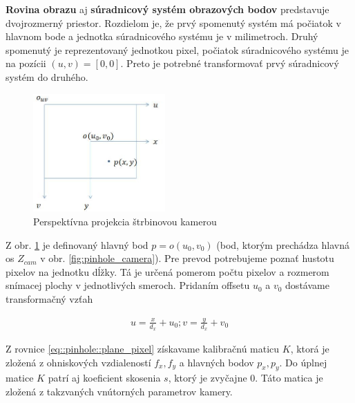 \textbf{Rovina obrazu} aj \textbf{súradnicový systém obrazových bodov} predstavuje dvojrozmerný priestor. Rozdielom je, že prvý spomenutý systém má počiatok v hlavnom bode a jednotka súradnicového systému je v milimetroch. Druhý spomenutý je reprezentovaný jednotkou pixel, počiatok súradnicového systému je na pozícii $\left(u,v\right)=\left[0,0\right]$. Preto je potrebné transformovať prvý súradnicový systém do druhého. 

\begin{figure}[h]
	\centering
	\includegraphics[width=0.45\textwidth]{figures/plane_pixel.jpg} 
	\caption{Perspektívna projekcia štrbinovou kamerou}
	\label{fig:plane_pixel}
\end{figure}

Z obr. \ref{fig:plane_pixel} je definovaný hlavný bod $p=o(u_0,v_0)$ (bod, ktorým prechádza hlavná os $Z_{cam}$ v obr. \ref{fig:pinhole_camera}). Pre prevod potrebujeme poznať hustotu pixelov na jednotku dĺžky. Tá je určená pomerom počtu pixelov a rozmerom snímacej plochy v jednotlivých smeroch. Pridaním offsetu $u_0$ a $v_0$ dostávame transformačný vzťah

\begin{equation}
\label{eq::pinhole::plane_pixel}
\begin{aligned}
u=\frac{x}{d_x} + u_0; v=\frac{y}{d_x} + v_0
\end{aligned}
\end{equation}

Z rovnice \ref{eq::pinhole::plane_pixel} získavame kalibračnú maticu $K$, ktorá je zložená z ohniskových vzdialeností $f_x, f_y$ a hlavných bodov $p_x, p_y$. Do úplnej matice $K$ patrí aj koeficient skosenia $s$, ktorý je zvyčajne 0. Táto matica je zložená z takzvaných vnútorných parametrov kamery.

